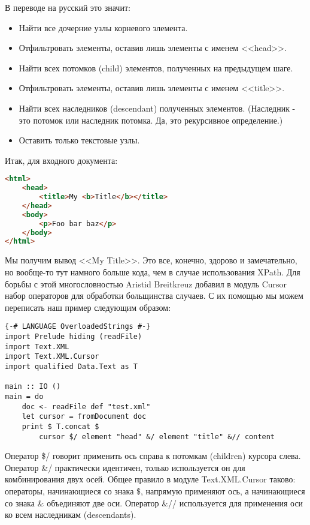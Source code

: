 В переводе на русский это значит:

\begin{itemize}
\item Найти все дочерние узлы корневого элемента.
\item Отфильтровать элементы, оставив лишь элементы с именем <<head>>.
\item Найти всех потомков (child) элементов, полученных на предыдущем шаге.
\item Отфильтровать элементы, оставив лишь элементы с именем <<title>>.
\item Найти всех наследников (descendant) полученных элементов. (Наследник - это потомок или наследник потомка. Да, это рекурсивное определение.)
\item Оставить только текстовые узлы.
\end{itemize}

Итак, для входного документа:

\begin{lstlisting}[language=HTML]
<html>
    <head>
        <title>My <b>Title</b></title>
    </head>
    <body>
        <p>Foo bar baz</p>
    </body>
</html>
\end{lstlisting}

Мы получим вывод <<My Title>>. Это все, конечно, здорово и замечательно, но вообще-то тут намного больше кода, чем в случае использования XPath. Для борьбы с этой многословностью Aristid Breitkreuz добавил в модуль Cursor набор операторов для обработки больщинства случаев. С их помощью мы можем переписать наш пример следующим образом:

\begin{lstlisting}
{-# LANGUAGE OverloadedStrings #-}
import Prelude hiding (readFile)
import Text.XML
import Text.XML.Cursor
import qualified Data.Text as T

main :: IO ()
main = do
    doc <- readFile def "test.xml"
    let cursor = fromDocument doc
    print $ T.concat $
        cursor $/ element "head" &/ element "title" &// content
\end{lstlisting}%

Оператор \$/ говорит применить ось справа к потомкам (children) курсора слева. Оператор \&/ практически идентичен, только используется он для комбинирования двух осей. Общее правило в модуле Text.XML.Cursor таково: операторы, начинающиеся со знака \$, напрямую применяют ось, а начинающиеся со знака \& объединяют две оси. Оператор \&// используется для применения оси ко всем наследникам (descendants).

